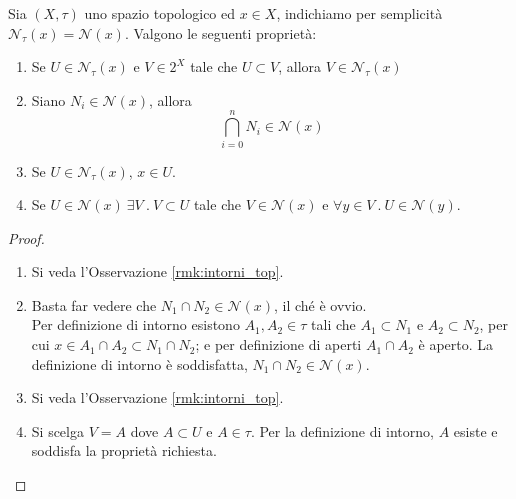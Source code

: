 \begin{proposition}
	Sia $(X,\tau)$ uno spazio topologico ed $x \in X$, indichiamo per semplicità $\mathcal{N}_\tau(x) = \mathcal{N}(x)$. Valgono le seguenti proprietà:
	\begin{enumerate}
		\item Se $U \in \mathcal{N}_\tau(x)$ e $V \in 2^X$ tale che $U \subset V$, allora $V \in \mathcal{N}_\tau(x)$
		\item Siano $N_i \in \mathcal{N}(x)$, allora 
		\begin{equation*}
			\bigcap^{n}_{i=0} N_i \in \mathcal{N}(x)
		\end{equation*}
		\item Se $U \in \mathcal{N}_\tau(x)$, $x \in U$. 
		\item Se $U \in \mathcal{N}(x) \ \exists V\ .\ V \subset U$ tale che $V \in \mathcal{N}(x)$ e $\forall y \in V\ .\ U \in \mathcal{N}(y)$.
	\end{enumerate}
\end{proposition}
\begin{proof} \
	\begin{enumerate}
		\item Si veda l'Osservazione \ref{rmk:intorni_top}.
		\item Basta far vedere che $N_1 \cap N_2 \in \mathcal{N}(x)$, il ché è ovvio. \\ Per definizione di intorno 
			esistono $A_1, A_2 \in \tau$ tali che $A_1 \subset N_1$ e $A_2 \subset N_2$, per cui $x \in A_1 \cap A_2 \subset N_1 \cap 
			N_2$; e per definizione di aperti $A_1 \cap A_2$ è aperto.  La definizione di intorno è soddisfatta, 
			$N_1 \cap N_2 \in \mathcal{N}(x)$.
		\item Si veda l'Osservazione \ref{rmk:intorni_top}.
		\item Si scelga $V = A$ dove $A \subset U$ e $A \in \tau$. Per la definizione di intorno, $A$ esiste e soddisfa la proprietà richiesta. 
	\end{enumerate}
\end{proof}  

